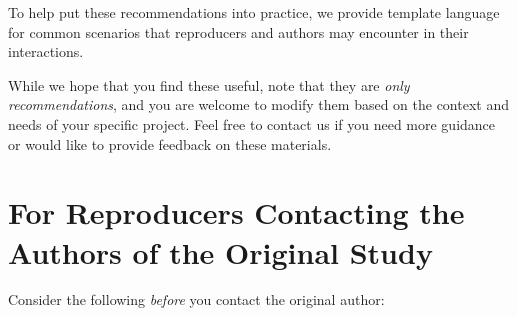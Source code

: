 \documentclass[]{book}
\begin{document}
To help put these recommendations into practice, we provide template language for common scenarios that reproducers and authors may encounter in their interactions.

While we hope that you find these useful, note that they are \emph{only recommendations}, and you are welcome to modify them based on the context and needs of your specific project. Feel free to contact us if you need more guidance or would like to provide feedback on these materials.

\hypertarget{for-reproducers-contacting-the-authors-of-the-original-study}{%
\section{For Reproducers Contacting the Authors of the Original Study}\label{for-reproducers-contacting-the-authors-of-the-original-study}}

Consider the following \emph{before} you contact the original author:
\end{document}
